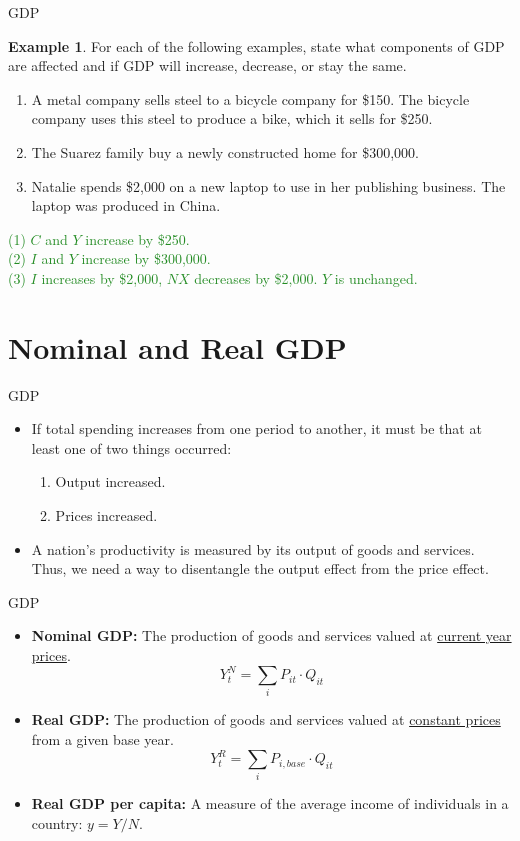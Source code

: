 \documentclass[xcolor={dvipsnames},pdf, hyperref={colorlinks=true, citecolor=ForestGreen, linkcolor=BlueViolet, urlcolor=Magenta}]{beamer}
\theoremstyle{definition}
\newtheorem{exmp}{Example}[section]
\newcommand{\defn}[1]{\textbf{#1}}
\newcommand{\ddp}[1]{{\textcolor{ForestGreen}{#1}}}
\begin{document}
\begin{frame}{GDP}
\begin{exmp}
	
	For each of the following examples, state what components of GDP are affected and if GDP will increase, decrease, or stay the same. 
	
	\begin{enumerate}

		\item	A metal company sells steel to a bicycle company for \$150. The bicycle company uses this steel to produce a bike, which it sells for \$250. 
		\item	The Suarez family buy a newly constructed home for \$300,000. 
		\item Natalie spends \$2,000 on a new laptop to use in her publishing business. The laptop was produced in China.
	\end{enumerate}
\end{exmp}

\ddp{\pause (1) $C$ and $Y$ increase by \$250. \\
\pause (2) $I$ and $Y$ increase by \$300,000. \\
\pause (3) $I$ increases by \$2,000, $NX$ decreases by \$2,000. $Y$ is unchanged.}
\end{frame}

\section{Nominal and Real GDP}

\begin{frame}{GDP}
\begin{itemize}
	\item If total spending increases from one period to another, it must be that at least one of two things occurred:
	\begin{enumerate}
		\item Output increased.
		\item Prices increased.
	\end{enumerate}
	\item A nation's productivity is measured by its output of goods and services. Thus, we need a way to disentangle the output effect from the price effect.
\end{itemize}
\end{frame}


\begin{frame}{GDP}
\begin{itemize}
	\item \defn{Nominal GDP:} The production of goods and services valued at \underline{current year prices}. 
	\[Y_t^N = \sum_i P_{it} \cdot Q_{it}\]
	\item 
	\defn{Real GDP:} The production of goods and services valued at \underline{constant prices} from a given base year. 
	\[Y_t^R = \sum_i P_{i,base} \cdot Q_{it}\]
	\item \defn{Real GDP per capita:} A measure of the average income of individuals in a country: $y = Y/N$.
\end{itemize}
\end{frame}
\end{document}
